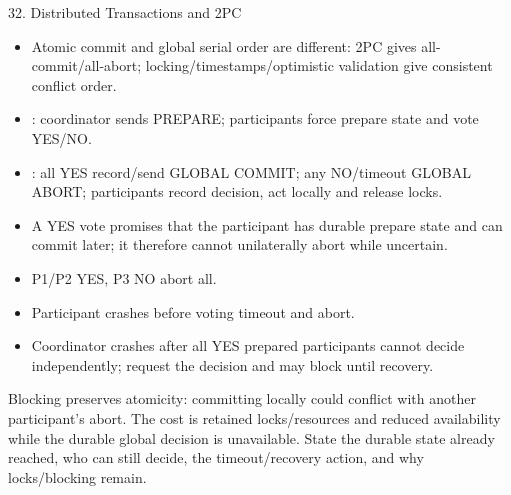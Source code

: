 \begin{topic}{32. Distributed Transactions and 2PC}
\begin{itemize}
  \item Atomic commit and global serial order are different: 2PC gives all-commit/all-abort; locking/timestamps/optimistic validation give consistent conflict order.
  \item {}: coordinator sends PREPARE; participants force prepare state and vote YES/NO.
  \item {}: all YES \arr record/send GLOBAL COMMIT; any NO/timeout \arr GLOBAL ABORT; participants record decision, act locally and release locks.
  \item A YES vote promises that the participant has durable prepare state and can commit later; it therefore cannot unilaterally abort while uncertain.
\end{itemize}
\worked
\begin{itemize}
  \item P1/P2 YES, P3 NO \arr abort all.
  \item Participant crashes before voting \arr timeout and abort.
  \item Coordinator crashes after all YES \arr prepared participants cannot decide independently; request the decision and may block until recovery.
\end{itemize}
\why Blocking preserves atomicity: committing locally could conflict with another participant's abort. The cost is retained locks/resources and reduced availability while the durable global decision is unavailable.
\answer State the durable state already reached, who can still decide, the timeout/recovery action, and why locks/blocking remain.
\end{topic}

